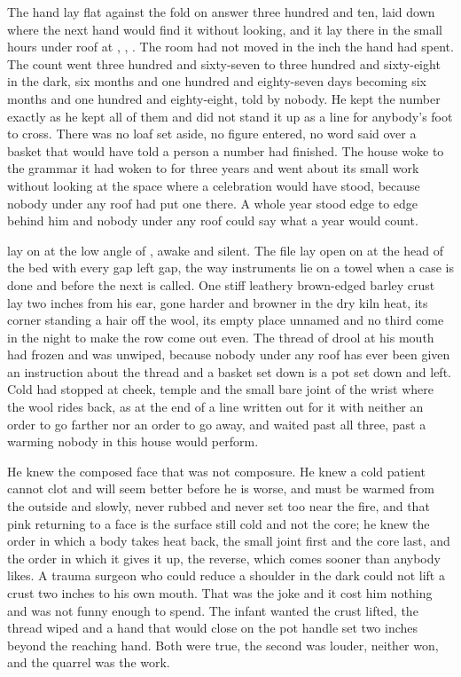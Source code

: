 
The hand lay flat against the fold on answer three hundred and ten, laid down where the next hand would find it without looking, and it lay there in the small hours under  roof at , , . The room had not moved in the inch the hand had spent. The count went three hundred and sixty-seven to three hundred and sixty-eight in the dark, six months and one hundred and eighty-seven days becoming six months and one hundred and eighty-eight, told by nobody. He kept the number exactly as he kept all of them and did not stand it up as a line for anybody's foot to cross. There was no loaf set aside, no figure entered, no word said over a basket that would have told a person a number had finished. The house woke to the grammar it had woken to for three years and went about its small work without looking at the space where a celebration would have stood, because nobody under any roof had put one there. A whole year stood edge to edge behind him and nobody under any roof could say what a year would count.

 lay on  at the low angle of , awake and silent. The file lay open on  at the head of the bed with every gap left gap, the way instruments lie on a towel when a case is done and before the next is called. One stiff leathery brown-edged barley crust lay two inches from his ear, gone harder and browner in the dry kiln heat, its corner standing a hair off the wool, its empty place unnamed and no third come in the night to make the row come out even. The thread of drool at his mouth had frozen and was unwiped, because nobody under any roof has ever been given an instruction about the thread and a basket set down is a pot set down and left. Cold had stopped at cheek, temple and the small bare joint of the wrist where the wool rides back, as at the end of a line written out for it with neither an order to go farther nor an order to go away, and  waited past all three, past a warming nobody in this house would perform.

He knew the composed face that was not composure. He knew a cold patient cannot clot and will seem better before he is worse, and must be warmed from the outside and slowly, never rubbed and never set too near the fire, and that pink returning to a face is the surface still cold and not the core; he knew the order in which a body takes heat back, the small joint first and the core last, and the order in which it gives it up, the reverse, which comes sooner than anybody likes. A trauma surgeon who could reduce a shoulder in the dark could not lift a crust two inches to his own mouth. That was the joke and it cost him nothing and was not funny enough to spend. The infant wanted the crust lifted, the thread wiped and a hand that would close on the pot handle set two inches beyond the reaching hand. Both were true, the second was louder, neither won, and the quarrel was the work.

